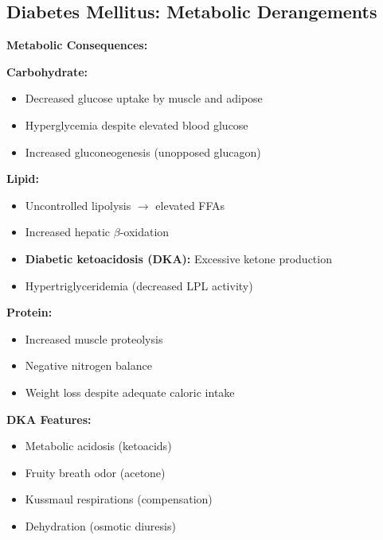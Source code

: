 \subsection{Diabetes Mellitus: Metabolic Derangements}

\begin{tcolorbox}[colback=red!5, colframe=red!70!black, title=\textbf{Type 1 Diabetes: Absolute Insulin Deficiency}]
\textbf{Metabolic Consequences:}

\textbf{Carbohydrate:}
\begin{itemize}
    \item Decreased glucose uptake by muscle and adipose
    \item Hyperglycemia despite elevated blood glucose
    \item Increased gluconeogenesis (unopposed glucagon)
\end{itemize}

\textbf{Lipid:}
\begin{itemize}
    \item Uncontrolled lipolysis $\rightarrow$ elevated FFAs
    \item Increased hepatic $\beta$-oxidation
    \item \textbf{Diabetic ketoacidosis (DKA):} Excessive ketone production
    \item Hypertriglyceridemia (decreased LPL activity)
\end{itemize}

\textbf{Protein:}
\begin{itemize}
    \item Increased muscle proteolysis
    \item Negative nitrogen balance
    \item Weight loss despite adequate caloric intake
\end{itemize}

\textbf{DKA Features:}
\begin{itemize}
    \item Metabolic acidosis (ketoacids)
    \item Fruity breath odor (acetone)
    \item Kussmaul respirations (compensation)
    \item Dehydration (osmotic diuresis)
\end{itemize}
\end{tcolorbox}

